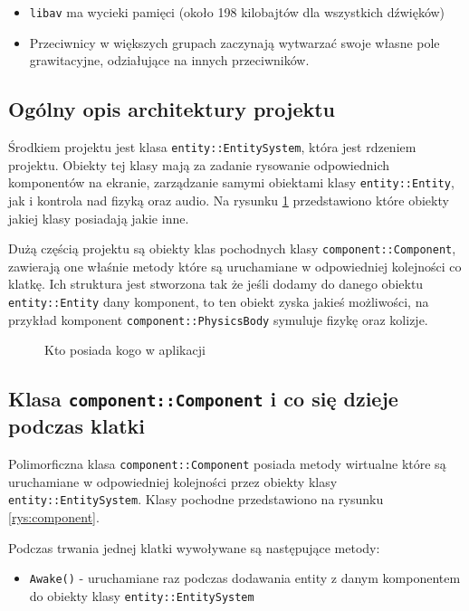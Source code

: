 \documentclass[a4paper,11pt]{article}
\begin{document}
\begin{itemize}
    \item \texttt{libav} ma wycieki pamięci (około 198 kilobajtów dla wszystkich
        dźwięków)
    \item Przeciwnicy w większych grupach zaczynają wytwarzać swoje własne pole
        grawitacyjne, odziałujące na innych przeciwników.
\end{itemize}

\subsection{Ogólny opis architektury projektu}

Środkiem projektu jest klasa \texttt{entity::EntitySystem}, która jest rdzeniem projektu. Obiekty tej klasy mają za zadanie rysowanie odpowiednich komponentów na ekranie, zarządzanie samymi obiektami klasy \texttt{entity::Entity}, jak i kontrola nad fizyką oraz audio. Na rysunku \ref{rys:owners} przedstawiono które obiekty jakiej klasy posiadają jakie inne.

Dużą częścią projektu są obiekty klas pochodnych klasy \texttt{component::Component}, zawierają one właśnie metody które są uruchamiane w odpowiedniej kolejności co klatkę. Ich struktura jest stworzona tak że jeśli dodamy do danego obiektu \texttt{entity::Entity} dany komponent, to ten obiekt zyska jakieś możliwości, na przykład komponent \texttt{component::PhysicsBody} symuluje fizykę oraz kolizje.
\begin{figure}
    \resizebox{\textwidth}{!}{%
    }
    \centering
    \caption{Kto posiada kogo w aplikacji}\label{rys:owners}
\end{figure}

\subsection{Klasa \texttt{component::Component} i co się dzieje podczas klatki}

Polimorficzna klasa \texttt{component::Component} posiada metody wirtualne które są uruchamiane w odpowiedniej kolejności przez obiekty klasy \texttt{entity::EntitySystem}. Klasy pochodne przedstawiono na rysunku \ref{rys:component}.

Podczas trwania jednej klatki wywoływane są następujące metody:

\begin{itemize}
    \item \texttt{Awake()} - uruchamiane raz podczas dodawania entity z danym komponentem do obiekty klasy \texttt{entity::EntitySystem}
\end{itemize}
\end{document}
